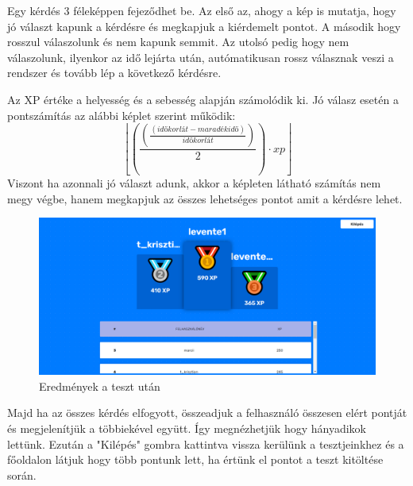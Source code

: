 Egy kérdés 3 féleképpen fejeződhet be. Az első az, ahogy a kép is mutatja, hogy jó választ kapunk a kérdésre és megkapjuk a kiérdemelt pontot. A második hogy rosszul válaszolunk és nem kapunk semmit. Az utolsó pedig hogy nem válaszolunk, ilyenkor az idő lejárta után, autómatikusan rossz válasznak veszi a rendszer és tovább lép a következő kérdésre.

Az XP értéke a helyesség és a sebesség alapján számolódik ki.
Jó válasz esetén a pontszámítás az alábbi képlet szerint működik:
\[ \left\lfloor\left(\frac{\left(\frac{\left( időkorlát - maradék idő\right)}{ időkorlát}\right)}{2}\right)\cdot xp\right\rfloor \]
Viszont ha azonnali jó választ adunk, akkor a képleten látható számítás nem megy végbe, hanem megkapjuk az összes lehetséges pontot amit a kérdésre lehet.


\begin{figure}[H]
    \centering
    \includegraphics[width=\linewidth]{images/results.png}
    \caption{Eredmények a teszt után}
\end{figure}

Majd ha az összes kérdés elfogyott, összeadjuk a felhasználó összesen elért pontját és megjelenítjük a többiekével együtt. Így megnézhetjük hogy hányadikok lettünk. Ezután a "Kilépés" gombra kattintva vissza kerülünk a tesztjeinkhez és a főoldalon látjuk hogy több pontunk lett, ha értünk el pontot a teszt kitöltése során.